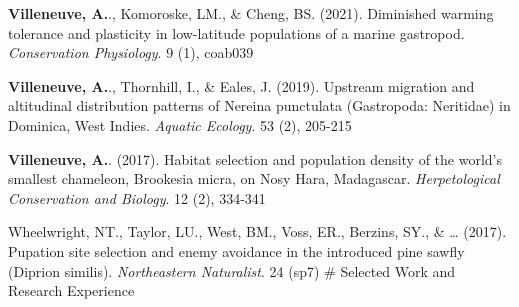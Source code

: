 \documentclass[11pt,a4paper,]{awesome-cv}
\begin{document}
\textbf{Villeneuve, A.}., Komoroske, LM., \& Cheng, BS. (2021).
Diminished warming tolerance and plasticity in low-latitude populations
of a marine gastropod. \emph{Conservation Physiology}. 9 (1), coab039

\textbf{Villeneuve, A.}., Thornhill, I., \& Eales, J. (2019). Upstream
migration and altitudinal distribution patterns of Nereina punctulata
(Gastropoda: Neritidae) in Dominica, West Indies. \emph{Aquatic
Ecology}. 53 (2), 205-215

\textbf{Villeneuve, A.}. (2017). Habitat selection and population
density of the world's smallest chameleon, Brookesia micra, on Nosy
Hara, Madagascar. \emph{Herpetological Conservation and Biology}. 12
(2), 334-341

Wheelwright, NT., Taylor, LU., West, BM., Voss, ER., Berzins, SY., \&
\ldots{} (2017). Pupation site selection and enemy avoidance in the
introduced pine sawfly (Diprion similis). \emph{Northeastern
Naturalist}. 24 (sp7) \# Selected Work and Research Experience
\end{document}
